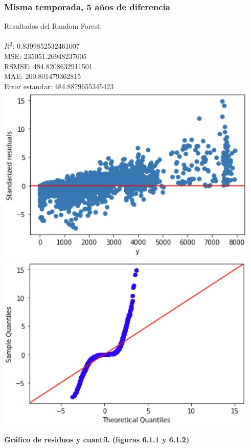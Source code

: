 \documentclass{article}
\begin{document}
        \subsubsection{Misma temporada, 5 años de diferencia}

            Resultados del Random Forest:\\
                    \\
                        $R^2$:  0.8399852532461007 \\
                        MSE:  235051.26948237605 \\
                        RSMSE:  484.8208632911501 \\
                        MAE:  200.801479362815 \\
                        Error estandar:  484.8879655345423 \\
                
                        \includegraphics[scale=0.6]{images/RFR_After_SS.jpg} 
                        \includegraphics[scale=0.6]{images/RFR_After_SS_Q.jpg} \\
                        \begin{center}
                            \textbf{Gráfico de residuos y cuantíl. (figuras 6.1.1 y 6.1.2)}
                        \end{center}
            
\end{document}
